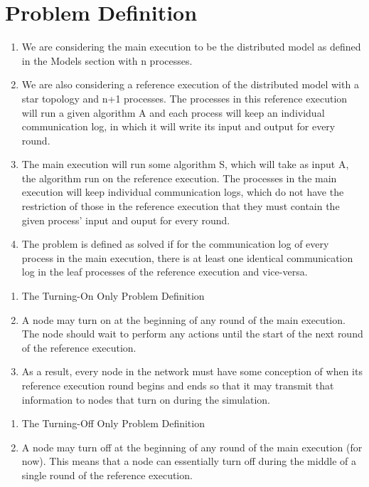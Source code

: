\documentclass[english]{article}
\begin{document}
\section{Problem Definition}

\begin{enumerate}
\item We are considering the main execution to be the distributed model as defined in the Models section with n processes.

\item We are also considering a reference execution of the distributed model with a star topology and n+1 processes. The processes in this reference execution will run a given algorithm A and each process will keep an individual communication log, in which it will write its input and output for every round.

\item The main execution will run some algorithm S, which will take as input A, the algorithm run on the reference execution. The processes in the main execution will keep individual communication logs, which do not have the restriction of those in the reference execution that they must contain the given process' input and ouput for every round.

\item The problem is defined as solved if for the communication log of every process in the main execution, there is at least one identical communication log in the leaf processes of the reference execution and vice-versa.

\end{enumerate}

\begin{enumerate}
\item The Turning-On Only Problem Definition

\item A node may turn on at the beginning of any round of the main execution. The node should wait to perform any actions until the start of the next round of the reference execution.

\item As a result, every node in the network must have some conception of when its reference execution round begins and ends so that it may transmit that information to nodes that turn on during the simulation.

\end{enumerate}

\begin{enumerate}
\item The Turning-Off Only Problem Definition

\item A node may turn off at the beginning of any round of the main execution (for now). This means that a node can essentially turn off during the middle of a single round of the reference execution. 

\end{enumerate}
\end{document}
